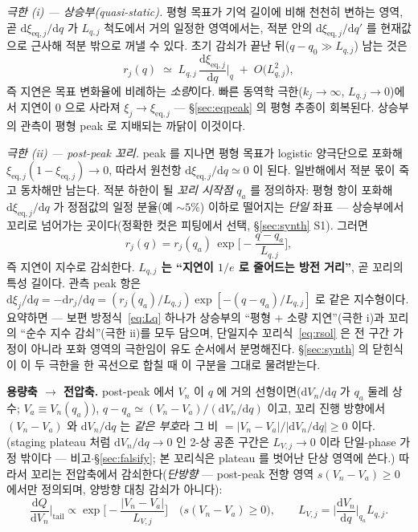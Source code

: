 \documentclass[11pt,a4paper]{article}
\newcommand{\dd}{\mathrm{d}}
\newcommand{\eq}{\mathrm{eq}}
\begin{document}
\emph{극한 (i) — 상승부(quasi-static).} 평형 목표가 기억 길이에 비해 천천히 변하는 영역, 곧
$\dd\xi_{\eq,j}/\dd q$ 가 $L_{q,j}$ 척도에서 거의 일정한 영역에서는, 적분 안의 $\dd\xi_{\eq,j}/\dd q'$ 를
현재값으로 근사해 적분 밖으로 꺼낼 수 있다. 초기 감쇠가 끝난 뒤($q-q_0\gg L_{q,j}$) 남는 것은
\begin{equation*}
r_j(q)\;\simeq\;L_{q,j}\,\frac{\dd\xi_{\eq,j}}{\dd q}\Big|_{q}\;+\;O\!\big(L_{q,j}^2\big),
\end{equation*}
즉 지연은 목표 변화율에 비례하는 \emph{소량}이다. 빠른 동역학 극한($k_j\to\infty$, $L_{q,j}\to0$)에서 지연이
$0$ 으로 사라져 $\xi_j\to\xi_{\eq,j}$ — \S\ref{sec:eqpeak} 의 평형 추종이 회복된다. 상승부의 관측이 평형
peak 로 지배되는 까닭이 이것이다.

\emph{극한 (ii) — post-peak 꼬리.} peak 를 지나면 평형 목표가 logistic 양극단으로 포화해
$\xi_{\eq,j}(1-\xi_{\eq,j})\to0$, 따라서 원천항 $\dd\xi_{\eq,j}/\dd q\simeq0$ 이 된다. 일반해에서 적분
몫이 죽고 동차해만 남는다. 적분 하한이 될 \emph{꼬리 시작점} $q_a$ 를 정의하자: 평형 항이 포화해
$\dd\xi_{\eq,j}/\dd q$ 가 정점값의 일정 분율(예 $\sim5\%$) 이하로 떨어지는 \emph{단일} 좌표 — 상승부에서
꼬리로 넘어가는 곳이다(정확한 컷은 피팅에서 선택, \S\ref{sec:synth} S1). 그러면
\begin{equation}
r_j(q)=r_j(q_a)\,\exp\!\Big[-\frac{q-q_a}{L_{q,j}}\Big],
\label{eq:rsol}
\end{equation}
즉 지연이 지수로 감쇠한다. \textbf{$L_{q,j}$ 는 ``지연이 $1/e$ 로 줄어드는 방전 거리''}, 곧 꼬리의 특성 길이다.
관측 peak 항은 $\dd\xi_j/\dd q=-\dd r_j/\dd q=(r_j(q_a)/L_{q,j})\exp[-(q-q_a)/L_{q,j}]$ 로 같은 지수형이다.
요약하면 — 보편 방정식~\eqref{eq:Lq} 하나가 상승부의 ``평형 $+$ 소량 지연''(극한 i)과 꼬리의 ``순수 지수
감쇠''(극한 ii)를 모두 담으며, 단일지수 꼬리식~\eqref{eq:rsol} 은 전 구간 가정이 아니라 포화 영역의 극한임이
유도 순서에서 분명해진다. \S\ref{sec:synth} 의 닫힌식이 이 두 극한을 한 곡선으로 합칠 때 이 구분을 그대로
물려받는다.

\textbf{용량축 $\to$ 전압축.} post-peak 에서 $V_n$ 이 $q$ 에 거의 선형이면($\dd V_n/\dd q$ 가 $q_a$ 둘레 상수;
$V_a\equiv V_n(q_a)$), $q-q_a\simeq(V_n-V_a)/(\dd V_n/\dd q)$ 이고, 꼬리 진행 방향에서 $(V_n-V_a)$ 와 $\dd V_n/\dd q$
는 \emph{같은 부호}라 그 비 $=|V_n-V_a|/|\dd V_n/\dd q|\ge0$ 이다. (staging plateau 처럼 $\dd V_n/\dd q\to0$ 인 2-상
공존 구간은 $L_{V,j}\to0$ 이라 단일-phase 가정 밖이다 — 비고$\cdot$\S\ref{sec:falsify}; 본 꼬리식은 plateau 를
벗어난 단상 영역에 쓴다.) 따라서 꼬리는 전압축에서 감쇠한다(\emph{단방향}
— post-peak 전향 영역 $s(V_n-V_a)\ge0$ 에서만 정의되며, 양방향 대칭 감쇠가 아니다):
\begin{equation}
\frac{\dd Q}{\dd V_n}\Big|_{\text{tail}}\propto\exp\!\Big[-\frac{|V_n-V_a|}{L_{V,j}}\Big]\quad\big(s(V_n-V_a)\ge0\big),\qquad
L_{V,j}=\Big|\frac{\dd V_n}{\dd q}\Big|_{q_a}L_{q,j}.
\label{eq:tail}
\end{equation}
\end{document}
